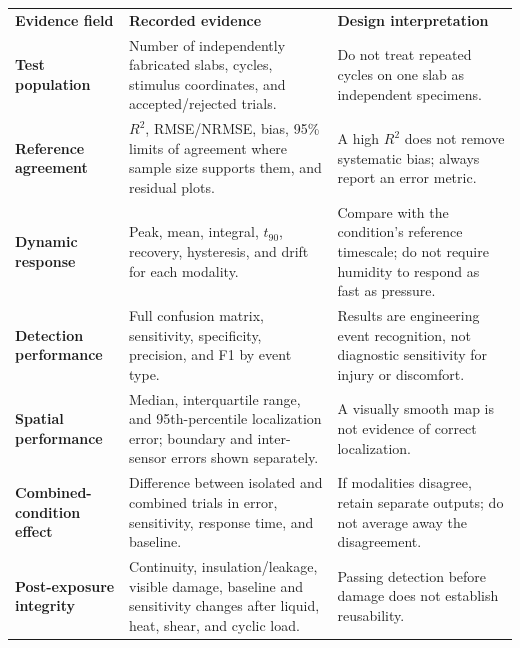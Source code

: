 \vspace{0.5em}
\begingroup
\fontsize{8.55}{10.05}\selectfont
\setlength{\tabcolsep}{3pt}
\renewcommand{\arraystretch}{1.14}
\begin{tabularx}{\linewidth}{>{\raggedright\arraybackslash\bfseries\color{AUBRed}}p{3.4cm}Y Y}
\color{white}\textbf{Evidence field} &
\color{white}\textbf{Recorded evidence} &
\color{white}\textbf{Design interpretation} \\
Test population & Number of independently fabricated slabs, cycles, stimulus
coordinates, and accepted/rejected trials. & Do not treat repeated cycles on
one slab as independent specimens. \\
Reference agreement & $R^2$, RMSE/NRMSE, bias, 95\% limits of agreement where
sample size supports them, and residual plots. & A high $R^2$ does not remove
systematic bias; always report an error metric. \\
Dynamic response & Peak, mean, integral, $t_{90}$, recovery, hysteresis, and
drift for each modality. & Compare with the condition's reference timescale;
do not require humidity to respond as fast as pressure. \\
Detection performance & Full confusion matrix, sensitivity, specificity,
precision, and F1 by event type. & Results are engineering event recognition,
not diagnostic sensitivity for injury or discomfort. \\
Spatial performance & Median, interquartile range, and 95th-percentile
localization error; boundary and inter-sensor errors shown separately. & A
visually smooth map is not evidence of correct localization. \\
Combined-condition effect & Difference between isolated and combined trials in
error, sensitivity, response time, and baseline. & If modalities disagree,
retain separate outputs; do not average away the disagreement. \\
Post-exposure integrity & Continuity, insulation/leakage, visible damage,
baseline and sensitivity changes after liquid, heat, shear, and cyclic load. &
Passing detection before damage does not establish reusability. \\
\end{tabularx}
\endgroup
{}

\vspace{0.65em}

